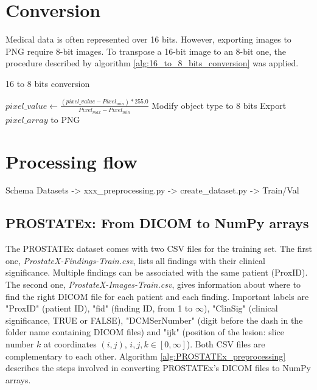 \section{Conversion}

Medical data is often represented over 16 bits. However, exporting images to PNG require 8-bit images. To transpose a 16-bit image to an 8-bit one, the procedure described by algorithm \ref{alg:16_to_8_bits_conversion} was applied.

\begin{algorithm}
    \caption{16 to 8 bits conversion}
    \label{alg:16_to_8_bits_conversion}
    \begin{algorithmic}[1] %
        			\State $pixel\_value \gets \frac{(pixel\_value - Pixel_{min}) * 255.0}{Pixel_{max} - Pixel_{min}}$
        		\EndFor
        		\State Modify object type to 8 bits
        		\State Export $pixel\_array$ to PNG
        \EndProcedure
    \end{algorithmic}
\end{algorithm}


\section{Processing flow}

Schema Datasets -> xxx\_preprocessing.py -> create\_dataset.py -> Train/Val


\subsection{PROSTATEx: From DICOM to NumPy arrays}

The PROSTATEx dataset comes with two CSV files for the training set. The first one, \textit{ProstateX-Findings-Train.csv}, lists all findings with their clinical significance. Multiple findings can be associated with the same patient (ProxID). The second one, \textit{ProstateX-Images-Train.csv}, gives information about where to find the right DICOM file for each patient and each finding. Important labels are "ProxID" (patient ID), "fid" (finding ID, from 1 to $\infty$), "ClinSig" (clinical significance, TRUE or FALSE), "DCMSerNumber" (digit before the dash in the folder name containing DICOM files) and "ijk" (position of the lesion: slice number $k$ at coordinates $(i,j)$, $i,j,k \in [0,\infty]$). Both CSV files are complementary to each other. Algorithm \ref{alg:PROSTATEx_preprocessing} describes the steps involved in converting PROSTATEx's DICOM files to NumPy arrays. 

